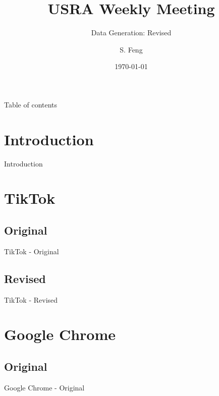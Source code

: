 \documentclass{beamer}
\title[USRA Weekly Meeting]{
  USRA Weekly Meeting
}
\subtitle[]{Data Generation: Revised}
\author[Shuo Feng]{S. Feng}
\institute[NIMS Lab]{
  NIMS Lab\\
  USRA Summer 2023}
\date{\today}
\begin{document}
\frame{\titlepage}


\begin{frame}{Table of contents}
  \tableofcontents
\end{frame}


\section{Introduction}
\begin{frame}{Introduction}
\end{frame}


\section{TikTok}

\subsection{Original}
\begin{frame}{TikTok - Original}
\end{frame}

\subsection{Revised}
\begin{frame}{TikTok - Revised}
\end{frame}


\section{Google Chrome}

\subsection{Original}
\begin{frame}{Google Chrome - Original}
\end{frame}
\end{document}
